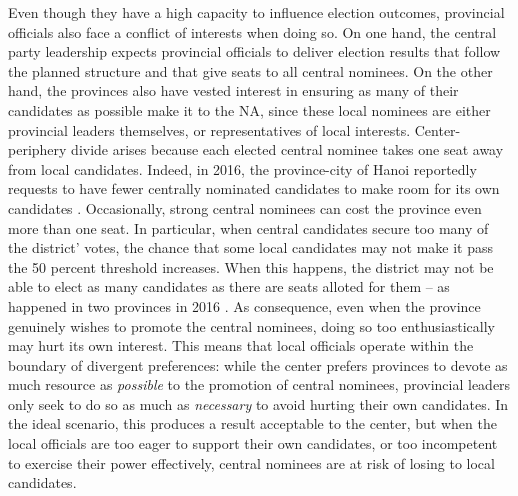 \documentclass[12pt]{article}\usepackage[]{graphicx}\usepackage[]{color}
\newcommand{\1}{\mathbbm{1}}
\begin{document}
Even though they have a high capacity to influence election outcomes, provincial officials also face a conflict of interests when doing so. On one hand, the central party leadership expects provincial officials to deliver election results that follow the planned structure and that give seats to all central nominees. On the other hand, the provinces also have vested interest in ensuring as many of their candidates as possible make it to the NA, since these local nominees are either provincial leaders themselves, or representatives of local interests. Center-periphery divide arises because each elected central nominee takes one seat away from local candidates. Indeed, in 2016, the province-city of Hanoi reportedly requests to have fewer centrally nominated candidates to make room for its own candidates \citep{vnexpress2016_2}. Occasionally, strong central nominees can cost the province even more than one seat. In particular, when central candidates secure too many of the district' votes, the chance that some local candidates may not make it pass the 50 percent threshold increases. When this happens, the district may not be able to elect as many candidates as there are seats alloted for them -- as happened in two provinces in 2016 \citep{vnexpress2016}. As consequence, even when the province genuinely wishes to promote the central nominees, doing so too enthusiastically may hurt its own interest. This means that local officials operate within the boundary of divergent preferences: while the center prefers provinces to devote as much resource as \textit{possible} to the promotion of central nominees, provincial leaders only seek to do so as much as \textit{necessary} to avoid hurting their own candidates. In the ideal scenario, this produces a result acceptable to the center, but when the local officials are too eager to support their own candidates, or too incompetent to exercise their power effectively, central nominees are at risk of losing to local candidates.
\end{document}

